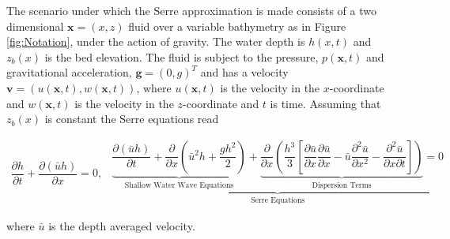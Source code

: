 \documentclass[SingleSpace,12pt,Proceedings]{Serre_ASCE}
\begin{document}
The scenario under which the Serre approximation is made consists of a two dimensional $\textbf{x} = (x,z)$ fluid over a variable bathymetry as in Figure \ref{fig:Notation}, under the action of gravity. The water depth is $h(x,t)$ and $z_b(x)$ is the bed elevation. The fluid is subject to the pressure, $p(\textbf{x},t)$ and gravitational acceleration, $\textbf{g} = (0,g)^T$ and has a velocity $\textbf{v} = (u(\textbf{x},t),w(\textbf{x},t))$, where $u(\textbf{x},t)$ is the velocity in the $x$-coordinate and $w(\textbf{x},t)$ is the velocity in the $z$-coordinate and $t$ is time. Assuming that $z_b(x)$ is constant the Serre equations read \cite{Guyenne-etal-2014-169,Zoppou-2014}
\begin{linenomath*}
\begin{subequations}\label{eq:Serre_conservative_form}
\begin{gather}
\dfrac{\partial h}{\partial t} + \dfrac{\partial (\bar{u}h)}{\partial x} = 0,
\label{eq:Serre_continuity}
\end{gather}
\begin{gather}
\underbrace{\underbrace{\dfrac{\partial (\bar{u}h)}{\partial t} + \dfrac{\partial}{\partial x} \left ( \bar{u}^2h + \dfrac{gh^2}{2}\right )}_{\text{Shallow Water Wave Equations}} + \underbrace{\dfrac{\partial}{\partial x} \left (  \dfrac{h^3}{3} \left [ \dfrac{\partial \bar{u} }{\partial x} \dfrac{\partial \bar{u}}{\partial x} - \bar{u} \dfrac{\partial^2 \bar{u}}{\partial x^2}  - \dfrac{\partial^2 \bar{u}}{\partial x \partial t}\right ] \right )}_{\text{Dispersion Terms}} = 0}_{\text{Serre Equations}}
\label{eq:Serre_momentum}
\end{gather}
\end{subequations}
\end{linenomath*}
where $\bar{u}$ is the depth averaged velocity.
\end{document}
